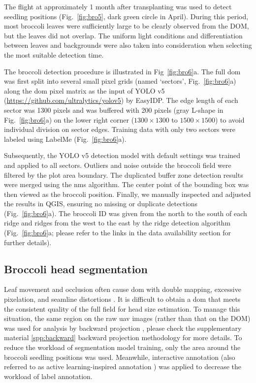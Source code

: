 The flight at approximately 1 month after transplanting was used to detect seedling positions (Fig.~\ref{fig:bro5}, dark green circle in April). During this period, most broccoli leaves were sufficiently large to be clearly observed from the DOM, but the leaves did not overlap. The uniform light conditions and differentiation between leaves and backgrounds were also taken into consideration when selecting the most suitable detection time.

The broccoli detection procedure is illustrated in Fig~\ref{fig:bro6}a. The full \gls{dom} was first split into several small pixel grids (named `sectors', Fig.~\ref{fig:bro6}a) along the \gls{dom} pixel matrix as the input of YOLO v5 (\url{https://github.com/ultralytics/yolov5}) by EasyIDP. The edge length of each sector was 1300 pixels and was buffered with 200 pixels (gray L-shape in Fig.~\ref{fig:bro6}a) on the lower right corner ($1300 \times 1300$ to $1500 \times 1500$) to avoid individual division on sector edges. Training data with only two sectors were labeled using LabelMe (Fig.~\ref{fig:bro6}a). 

Subsequently, the YOLO v5 detection model with default settings was trained and applied to all sectors. Outliers and noise outside the broccoli field were filtered by the plot area boundary. The duplicated buffer zone detection results were merged using the \gls{nms} algorithm. The center point of the bounding box was then viewed as the broccoli position. Finally, we manually inspected and adjusted the results in QGIS, ensuring no missing or duplicate detections (Fig.~\ref{fig:bro6}a). The broccoli ID was given from the north to the south of each ridge and ridges from the west to the east by the ridge detection algorithm (Fig.~\ref{fig:bro6}a; please refer to the links in the data availability section for further details). 

\subsection{Broccoli head segmentation}

Leaf movement and occlusion often cause \gls{dom} with double mapping, excessive pixelation, and seamline distortions \citep{lin_new_2021}. It is difficult to obtain a \gls{dom} that meets the consistent quality of the full field for head size estimation. To manage this situation, the same region on the raw \gls{uav} images (rather than that on the DOM) was used for analysis by backward projection \citep{wang_easyidp_2021}, please check the supplementary material \ref{spp:backward} backward projection methodology for more details. To reduce the workload of segmentation model training, only the area around the broccoli seedling positions was used. Meanwhile, interactive annotation (also referred to as active learning-inspired annotation \citep{ghosal_weakly_2019}) was applied to decrease the workload of label annotation. 

